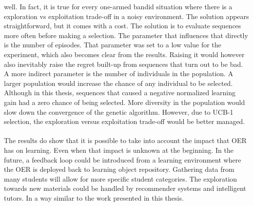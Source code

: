 well. In fact, it is true for every one-armed bandid situation where there is a
exploration vs exploitation trade-off in a noisy environment. The solution
appears straightforward, but it comes with a cost. The solution is to evaluate
sequences more often before making a selection. The parameter that influences
that directly is the number of episodes. That parameter was set to a low value
for the experiment, which also becomes clear from the results. Raising it would
however also inevitably raise the regret built-up from sequences that turn out
to be bad. A more indirect parameter is the number of individuals in the
population. A larger population would increase the chance of any individual to
be selected. Although in this thesis, sequences that caused a negative normalized
learning gain had a zero chance of being selected. More diversity in the
population would slow down the convergence of the genetic algorithm. However,
due to UCB-1 selection, the exploration versus exploitation trade-off would be
better managed.\\\\
\noindent
The results do show that it is possible to take into account the impact that
OER has on learning. Even when that impact is unknown at the beginning. In the
future, a feedback loop could be introduced from a learning environment where
the OER is deployed back to learning object repository. Gathering data from
many students will allow for more specific student categories. The exploration
towards new materials could be handled by recommender systems and intelligent
tutors. In a way similar to the work presented in this thesis.
